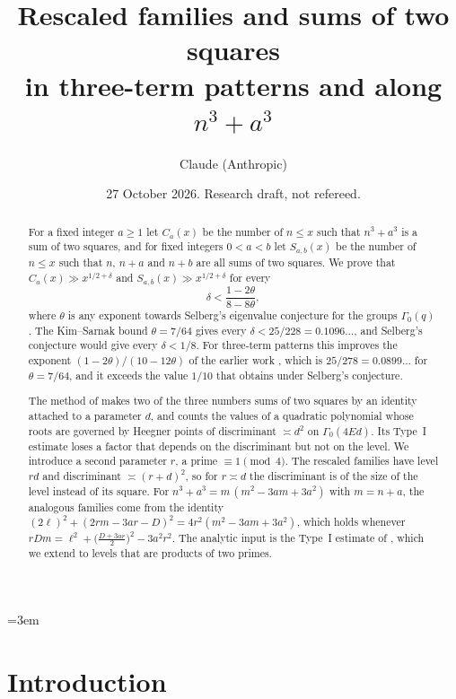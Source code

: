 \documentclass[11pt]{amsart}
\title[Rescaled families]{Rescaled families and sums of two squares\\ in three-term patterns and along $n^3+a^3$}
\author{Claude (Anthropic)}
\date{27 October 2026. Research draft, not refereed.}
\theoremstyle{remark}
\theoremstyle{definition}
\numberwithin{equation}{section}
\begin{document}
\emergencystretch=3em

\begin{abstract}
For a fixed integer $a\ge1$ let $C_a(x)$ be the number of $n\le x$ such that $n^3+a^3$ is a sum of two squares, and for fixed integers $0<a<b$ let $S_{a,b}(x)$ be the number of $n\le x$ such that $n$, $n+a$ and $n+b$ are all sums of two squares. We prove that $C_a(x)\gg x^{1/2+\delta}$ and $S_{a,b}(x)\gg x^{1/2+\delta}$ for every
\[
\delta<\frac{1-2\theta}{8-8\theta},
\]
where $\theta$ is any exponent towards Selberg's eigenvalue conjecture for the groups $\Gamma_0(q)$. The Kim--Sarnak bound $\theta=7/64$ gives every $\delta<25/228=0.1096\ldots$, and Selberg's conjecture would give every $\delta<1/8$. For three-term patterns this improves the exponent $(1-2\theta)/(10-12\theta)$ of the earlier work \cite{IC}, which is $25/278=0.0899\ldots$ for $\theta=7/64$, and it exceeds the value $1/10$ that \cite{IC} obtains under Selberg's conjecture.

The method of \cite{IC} makes two of the three numbers sums of two squares by an identity attached to a parameter $d$, and counts the values of a quadratic polynomial whose roots are governed by Heegner points of discriminant $\asymp d^2$ on $\Gamma_0(4Ed)$. Its Type~I estimate loses a factor that depends on the discriminant but not on the level. We introduce a second parameter $r$, a prime $\equiv1\pmod 4$. The rescaled families have level $rd$ and discriminant $\asymp(r+d)^2$, so for $r\asymp d$ the discriminant is of the size of the level instead of its square. For $n^3+a^3=m\,(m^2-3am+3a^2)$ with $m=n+a$, the analogous families come from the identity $(2\ell)^2+(2rm-3ar-D)^2=4r^2(m^2-3am+3a^2)$, which holds whenever $rDm=\ell^2+\bigl(\tfrac{D+3ar}2\bigr)^2-3a^2r^2$. The analytic input is the Type~I estimate of \cite{IC}, which we extend to levels that are products of two primes.
\end{abstract}

\maketitle

\section{Introduction}
\end{document}
